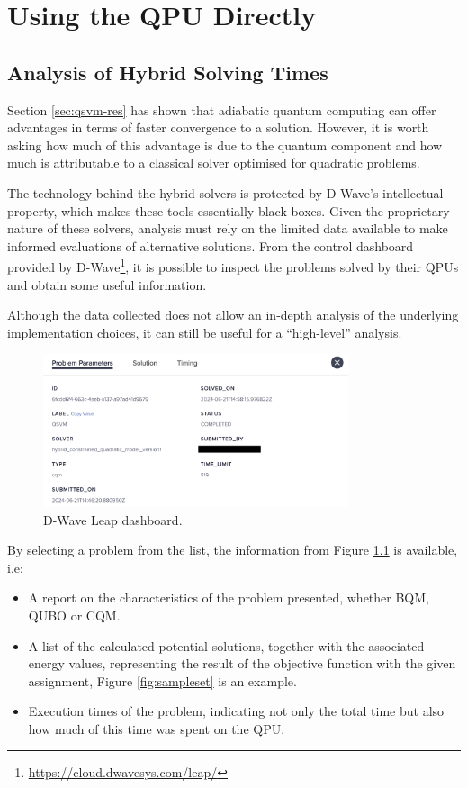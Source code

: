 \chapter{Using the QPU Directly}\label{sec:qpuonly}

\section{Analysis of Hybrid Solving Times}

Section \ref{sec:qsvm-res} has shown that adiabatic quantum computing can offer advantages in terms of faster convergence to a solution. However, it is worth asking how much of this advantage is due to the quantum component and how much is attributable to a classical solver optimised for quadratic problems.

The technology behind the hybrid solvers is protected by D-Wave's intellectual property, which makes these tools essentially black boxes. Given the proprietary nature of these solvers, analysis must rely on the limited data available to make informed evaluations of alternative solutions.
From the control dashboard provided by D-Wave\footnote{\url{https://cloud.dwavesys.com/leap/}}, it is possible to inspect the problems solved by their QPUs and obtain some useful information.

Although the data collected does not allow an in-depth analysis of the underlying implementation choices, it can still be useful for a ``high-level'' analysis.
\begin{figure}
    \centering
    \includegraphics[width=0.8\textwidth]{figures/dashboard.png}
    \caption{D-Wave Leap dashboard.}
    \label{fig:dwaveleap}
\end{figure}
By selecting a problem from the list, the information from Figure \ref{fig:dwaveleap} is available, i.e: 
\begin{itemize} 
	\item A report on the characteristics of the problem presented, whether BQM, QUBO or CQM. 
	\item A list of the calculated potential solutions, together with the associated energy values, representing the result of the objective function with the given assignment, Figure \ref{fig:sampleset} is an example. 
	\item Execution times of the problem, indicating not only the total time but also how much of this time was spent on the QPU. 
\end{itemize}

